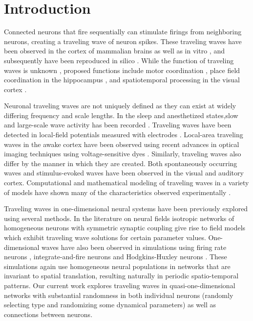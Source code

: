 \documentclass[12pt]{article}
\begin{document}
\section{Introduction} 
Connected neurons that fire sequentially can stimulate firings from neighboring neurons, creating a traveling wave of neuron spikes. 
These traveling waves have been observed in the cortex of mammalian brains \parencite{Muller2018}\parencite{reimer2010}  as well as in vitro \parencite{wu2008}\parencite{huang2004}\parencite{Golomb1999}, and subsequently have been reproduced in silico \parencite{keane2015}\parencite{Senk2020}\color{red}\parencite{Golomb1996}\parencite{ermentrout2001}\color{black}. 
While the function of traveling waves is unknown \parencite{wu2008}\parencite{Muller2018}, proposed functions include motor coordination \color{red}\parencite{Rubino2006}\color{black} , place field coordination in the hippocampus \parencite{lubernov2009}, and spatiotemporal processing in the visual cortex \parencite{wu2008}\parencite{Muller2014}.

Neuronal traveling waves are not uniquely defined as they can exist at widely differing frequency and scale lengths.  
In the sleep and anesthetized states,slow and large-scale wave activity has been recorded \parencite{Muller2018}. 
Traveling waves have been detected in local-field potentials measured with electrodes \cite{Rubino2006}\parencite{sanes1993}\color{red}\parencite{Riehle2013}\color{black}.
Local-area traveling waves in the awake cortex have been observed using recent advances in optical imaging techniques using voltage-sensitive dyes \parencite{wu2008}\parencite{Shoham1999}\color{red}\parencite{Xu2007}\parencite{Ferezou2006}\color{black}.  
Similarly, traveling waves also differ by the manner in which they are created. 
Both spontaneously occurring waves and stimulus-evoked \parencite{reimer2010} waves have been observed in the visual and auditory cortex. 
Computational and mathematical modeling of traveling waves in a variety of models have shown many of the characteristics observed experimentally \parencite{ermentrout2001}\parencite{keane2015}\parencite{gibson2009}.

\color{red}
Traveling waves in one-dimensional neural systems have been previously explored using several methods.
In the literature on neural fields \parencite{Ermentrout1979}\parencite{Folias2012}\parencite{Wilson1973} isotropic networks of homogeneous neurons with symmetric synaptic coupling give rise to field models which exhibit traveling wave solutions for certain parameter values. 
One-dimensional waves have also been observed in simulations using firing rate neurons \parencite{Senk2020}\parencite{Roxin2005}, integrate-and-fire neurons \parencite{Bressloff1997}\parencite{Golomb1999} and Hodgkins-Huxley neurons \parencite{Golomb1997}.
These simulations again use homogeneous neural populations in networks that are invariant to spatial translation, resulting naturally in periodic spatio-temporal patterns.
Our current work explores traveling waves in quasi-one-dimensional networks with substantial randomness in both individual neurons (randomly selecting type and randomizing some dynamical parameters) as well as connections between neurons.
\color{black}
\end{document}
